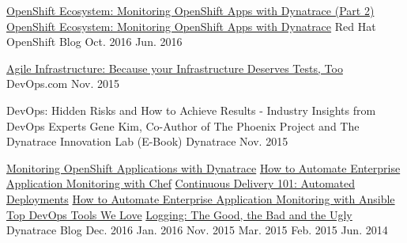 

\begin{cventries}

  \cventry
    {
      \href{https://blog.openshift.com/openshift-ecosystem-monitoring-openshift-apps-with-dynatrace-part-2/}{OpenShift Ecosystem: Monitoring OpenShift Apps with Dynatrace (Part 2)} \break
      \href{https://blog.openshift.com/openshift-ecosystem-monitoring-openshift-apps-with-dynatrace/}{OpenShift Ecosystem: Monitoring OpenShift Apps with Dynatrace}
    }
    {Red Hat OpenShift Blog}
    {}
    {
      Oct. 2016 \break
      Jun. 2016
    }
    {}
    
    \vspace{-4mm}
  
  \cventry
    {\href{https://devops.com/agile-infrastructure-infrastructure-deserves-tests/}{Agile Infrastructure: Because your Infrastructure Deserves Tests, Too}}
    {DevOps.com}
    {}
    {Nov. 2015}
    {}

  \vspace{-4mm}

  \cventry
    {
      DevOps: Hidden Risks and How to Achieve Results - Industry Insights from DevOps Experts \break
      Gene Kim, Co-Author of The Phoenix Project and The Dynatrace Innovation Lab (E-Book)
    }
    {Dynatrace}
    {}
    {Nov. 2015 \break}
    {}

    \vspace{-4mm}

  \cventry
    {
      \href{https://www.dynatrace.com/news/blog/monitoring-openshift-applications-with-dynatrace/}{Monitoring OpenShift Applications with Dynatrace} \break
      \href{https://www.dynatrace.com/news/blog/automate-enterprise-application-monitoring-chef/}{How to Automate Enterprise Application Monitoring with Chef} \break
      \href{https://www.dynatrace.com/news/blog/continuous-delivery-101-automated-deployments/}{Continuous Delivery 101: Automated Deployments} \break
      \href{https://www.dynatrace.com/news/blog/how-to-automate-enterprise-application-monitoring-with-ansible/}{How to Automate Enterprise Application Monitoring with Ansible} \break
      \href{https://www.dynatrace.com/news/blog/top-devops-tools-love/}{Top DevOps Tools We Love} \break
      \href{https://www.dynatrace.com/news/blog/software-quality-metrics-for-your-continuous-delivery-pipeline-part-iii-logging/}{Logging: The Good, the Bad and the Ugly}
    }
    {Dynatrace Blog}
    {}
    {
      Dec. 2016 \break
      Jan. 2016 \break
      Nov. 2015 \break
      Mar. 2015 \break
      Feb. 2015 \break
      Jun. 2014
    }
    {}

    \vspace{-4mm}

\end{cventries}
